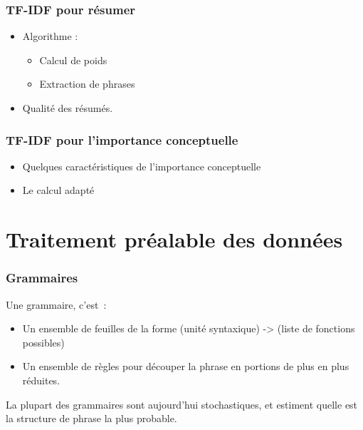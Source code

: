 \documentclass[12pt, handout]{beamer}
\begin{document}
\begin{frame}
 \frametitle{TF-IDF pour résumer}
 \begin{itemize}
  \item Algorithme :
  	\begin{itemize}
  	\item Calcul de poids
  	\item Extraction de phrases
  	\end{itemize}
  \item Qualité des résumés.
 \end{itemize}
 
\end{frame}


\begin{frame}
 \frametitle{TF-IDF pour l'importance conceptuelle}
 \begin{itemize}
  	\item Quelques caractéristiques de l'importance conceptuelle
  	\item Le calcul adapté
  \end{itemize}
 
\end{frame}


\section{Traitement préalable des données}


\begin{frame}
 \frametitle{Grammaires}
 Une grammaire, c'est~:
 \begin{itemize}
  \item Un ensemble de feuilles de la forme (unité syntaxique) -> (liste de fonctions possibles)
  \item Un ensemble de règles pour découper la phrase en portions de plus en plus réduites.
 \end{itemize}
 La plupart des grammaires sont aujourd'hui stochastiques, et estiment quelle est la structure de phrase la plus probable.
 
\end{frame}
\end{document}
